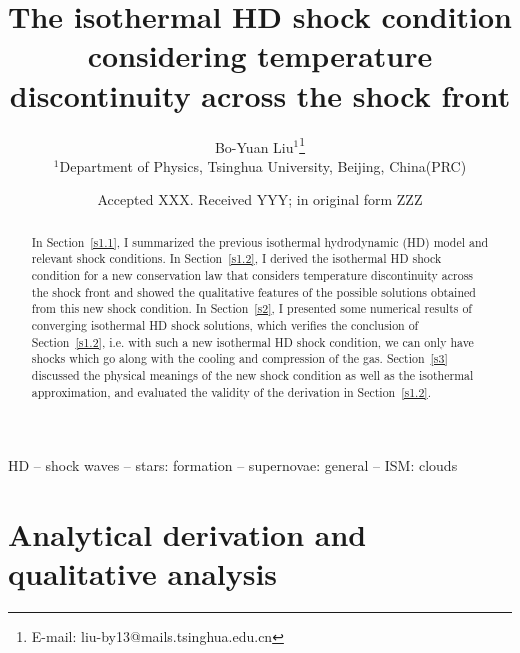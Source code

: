 \documentclass[fleqn,usenatbib]{mnras}
\title[Note on December 11]{The isothermal HD shock condition considering temperature discontinuity across the shock front}
\author[Bo-Yuan Liu]{Bo-Yuan Liu$^{1}$\thanks{E-mail: liu-by13@mails.tsinghua.edu.cn}
\\
$^{1}$Department of Physics, Tsinghua University, Beijing, China(PRC)\\
}
\date{Accepted XXX. Received YYY; in original form ZZZ}
\begin{document}
\label{firstpage}
\pagerange{\pageref{firstpage}--\pageref{lastpage}}
\maketitle
\begin{abstract}
In Section~\ref{s1.1}, I summarized the previous isothermal hydrodynamic (HD) model and relevant shock conditions. In Section~\ref{s1.2}, I derived the isothermal HD shock condition for a new conservation law that considers temperature discontinuity across the shock front and showed the qualitative features of the possible solutions obtained from this new shock condition. In Section~\ref{s2}, I presented some numerical results of converging isothermal HD shock solutions, which verifies the conclusion of Section~\ref{s1.2}, i.e. with such a new isothermal HD shock condition, we can only have shocks which go along with the cooling and compression of the gas. Section~\ref{s3} discussed the physical meanings of the new shock condition as well as the isothermal approximation, and evaluated the validity of the derivation in Section~\ref{s1.2}.
\end{abstract}
\begin{keywords}
HD -- shock waves -- stars: formation -- supernovae: general -- ISM: clouds
\end{keywords}





\section{Analytical derivation and qualitative analysis}
\label{s1}
\end{document}
